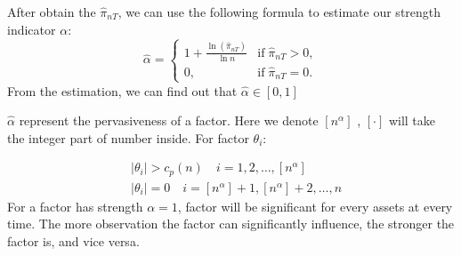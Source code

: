 \documentclass[12pt]{article}
\begin{document}
 After obtain the $\hat{\pi}_{nT}$, we can use the following formula to estimate our strength indicator $\alpha$:
\[ \hat{\alpha} = \begin{cases}
1+\frac{\ln(\hat{\pi}_{nT})}{\ln n} & \text{if}\; \hat{\pi}_{nT} > 0,\\
	0, & \text{if}\; \hat{\pi}_{nT} = 0.
\end{cases} \]
From the estimation, we can find out that $\hat{\alpha} \in [0,1]$

$\hat{\alpha}$ represent the pervasiveness of a factor. 
Here we denote $[n^{\alpha}]$ , $[\cdot]$ will take the integer part of number inside. 
For factor $\theta_{i}$:

\begin{align*}
&|\theta_{i}| > c_p(n)\quad i = 1, 2,  \dots, [n^{\alpha}]\\
&|\theta_{i}| = 0 \quad i = [n^{\alpha}] + 1, [n^{\alpha}] +2 ,\dots, n
\end{align*}
For a factor has strength $\alpha = 1$,  factor will be significant  for every assets at every time. 
The more observation the factor can significantly influence, the stronger the factor is, and vice versa.\textsl{}


\newpage


\end{document}
